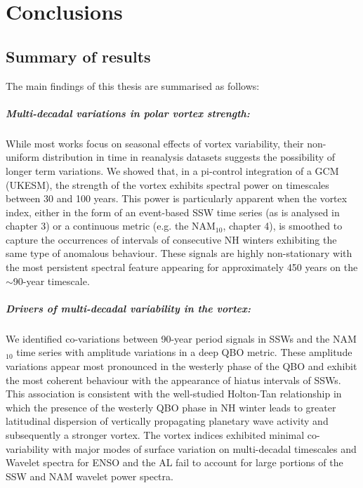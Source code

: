 \chapter{Conclusions}
\label{cha:conclusions}

\section{Summary of results}

The main findings of this thesis are summarised as follows: 

\paragraph{Multi-decadal variations in polar vortex strength:}
While most works focus on seasonal effects of vortex variability, their non-uniform distribution in time in reanalysis datasets suggests the possibility of longer term variations. We showed that, in a pi-control integration of a GCM (UKESM), the strength of the vortex exhibits spectral power on timescales between 30 and 100 years. This power is particularly apparent when the vortex index, either in the form of an event-based SSW time series (as is analysed in chapter 3) or a continuous metric (e.g. the NAM$_{10}$, chapter 4), is smoothed to capture the occurrences of intervals of consecutive NH winters exhibiting the same type of anomalous behaviour. These signals are highly non-stationary with the most persistent spectral feature appearing for approximately 450 years on the $\sim$90-year timescale. 

\paragraph{Drivers of multi-decadal variability in the vortex:}
We identified co-variations between 90-year period signals in SSWs and the NAM$_{10}$ time series with amplitude variations in a deep QBO metric. These amplitude variations appear most pronounced in the westerly phase of the QBO and exhibit the most coherent behaviour with the appearance of hiatus intervals of SSWs. This association is consistent with the well-studied Holton-Tan relationship in which the presence of the westerly QBO phase in NH winter leads to greater latitudinal dispersion of vertically propagating planetary wave activity and subsequently a stronger vortex. The vortex indices exhibited minimal co-variability with major modes of surface variation on multi-decadal timescales and Wavelet spectra for ENSO and the AL fail to account for large portions of the SSW and NAM wavelet power spectra.

